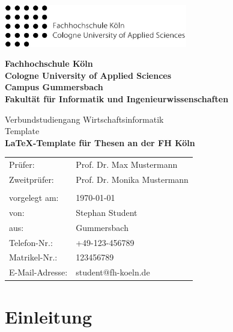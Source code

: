 \documentclass[12pt,oneside,a4paper,bibtotoc,liststotoc]{scrreprt}
\begin{document}
\begin{titlepage}

\includegraphics[width=8cm]{img/fhk.jpg}

\begin{center}
\textbf{\LARGE Fachhochschule Köln\\
Cologne University of Applied Sciences\\[0.5cm]
Campus Gummersbach\\[0.5cm]
Fakultät für Informatik und Ingenieurwissenschaften\\[1cm]}
 
\Large Verbundstudiengang Wirtschaftsinformatik\\[1cm]

\Large Template \\[1cm]
  
{ \huge \bfseries \LaTeX-Template für Thesen an der FH Köln}\\

\vfill

\begin{table}[h]
\centering
\begin{tabular}{p{4cm}p{5cm}}
  Prüfer:         & Prof. Dr. Max Mustermann \\
  Zweitprüfer:    & Prof. Dr. Monika Mustermann \\
                  &  \\
  vorgelegt am:   & \today \\
  von:            & Stephan Student \\
  aus:	  	  & Gummersbach \\
  Telefon-Nr.:	  & +49-123-456789 \\
  Matrikel-Nr.:   & 123456789 \\
  E-Mail-Adresse: & student@fh-koeln.de
\end{tabular}
\end{table}
\end{center}
\end{titlepage}

\tableofcontents

\chapter{Einleitung}
\end{document}
